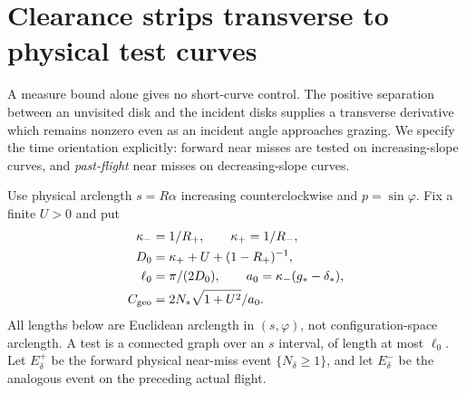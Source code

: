 \section{Clearance strips transverse to physical test curves}
\label{sec:cf-transverse}
A measure bound alone gives no short-curve control. The positive
separation between an unvisited disk and the incident disks supplies
a transverse derivative which remains nonzero even as an incident
angle approaches grazing. We specify the time orientation explicitly:
forward near misses are tested on increasing-slope curves, and
\emph{past-flight} near misses on decreasing-slope curves.

Use physical arclength $s=R\alpha$ increasing counterclockwise and
$p=\sin\varphi$. Fix a finite $U>0$ and put
\begin{equation}\label{eq:cf-curve-constants}
 \begin{split}
 \kappa_-&=1/R_+,\qquad \kappa_+=1/R_-,\\
 D_0&=\kappa_++U+(1-R_+)^{-1},\\
 \ell_0&=\pi/(2D_0),\qquad
 a_0=\kappa_-(g_*-\delta_*),\\
 C_{\rm geo}&=2N_*\sqrt{1+U^2}/a_0.
 \end{split}
\end{equation}
All lengths below are Euclidean arclength in $(s,\varphi)$, not
configuration-space arclength. A test is a connected graph over an
$s$ interval, of length at most $\ell_0$. Let $E_\delta^+$ be the
forward physical near-miss event $\{N_\delta\ge1\}$, and let
$E_\delta^-$ be the analogous event on the preceding actual flight.

